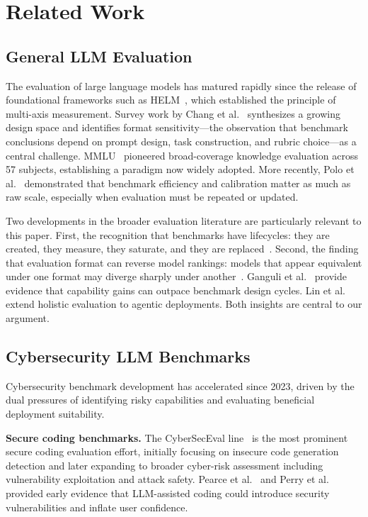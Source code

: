 \documentclass[final]{elsarticle}
\begin{document}
\section{Related Work}

\subsection{General LLM Evaluation}

The evaluation of large language models has matured rapidly since the release of foundational frameworks such as HELM~\cite{liang2023helm}, which established the principle of multi-axis measurement. Survey work by Chang et al.~\cite{chang2024survey} synthesizes a growing design space and identifies format sensitivity---the observation that benchmark conclusions depend on prompt design, task construction, and rubric choice---as a central challenge. MMLU~\cite{hendrycks2021measuring} pioneered broad-coverage knowledge evaluation across 57 subjects, establishing a paradigm now widely adopted. More recently, Polo et al.~\cite{polo2024tinybenchmarks} demonstrated that benchmark efficiency and calibration matter as much as raw scale, especially when evaluation must be repeated or updated.

Two developments in the broader evaluation literature are particularly relevant to this paper. First, the recognition that benchmarks have lifecycles: they are created, they measure, they saturate, and they are replaced~\cite{ott2022fairness}. Second, the finding that evaluation format can reverse model rankings: models that appear equivalent under one format may diverge sharply under another~\cite{liang2023helm,chang2024survey}. Ganguli et al.~\cite{ganguli2022predictability} provide evidence that capability gains can outpace benchmark design cycles. Lin et al.~\cite{lin2024holistic} extend holistic evaluation to agentic deployments. Both insights are central to our argument.

\subsection{Cybersecurity LLM Benchmarks}

Cybersecurity benchmark development has accelerated since 2023, driven by the dual pressures of identifying risky capabilities and evaluating beneficial deployment suitability.

\textbf{Secure coding benchmarks.} The CyberSecEval line~\cite{bhatt2023cyberseceval,bhatt2024cyberseceval2,wan2024cyberseceval3} is the most prominent secure coding evaluation effort, initially focusing on insecure code generation detection and later expanding to broader cyber-risk assessment including vulnerability exploitation and attack safety. Pearce et al.~\cite{pearce2022copilot} and Perry et al.~\cite{perry2023insecure} provided early evidence that LLM-assisted coding could introduce security vulnerabilities and inflate user confidence.
\end{document}

